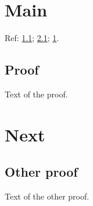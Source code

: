 \documentclass{report}
\begin{document}
\chapter{Main}\label{main}
Ref: \ref{s:p}; \ref{s:q}; \ref{main}.
\begin{subappendices}
\section{Proof}\label{s:p}
Text of the proof.
\end{subappendices}
\chapter{Next}
\begin{subappendices}
\section{Other proof}\label{s:q}
Text of the other proof.
\end{subappendices}
\end{document}
